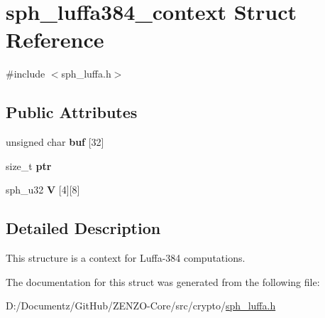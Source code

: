 \hypertarget{structsph__luffa384__context}{}\section{sph\+\_\+luffa384\+\_\+context Struct Reference}
\label{structsph__luffa384__context}


{\ttfamily \#include $<$sph\+\_\+luffa.\+h$>$}

\subsection*{Public Attributes}
\begin{DoxyCompactItemize}
\item 
\mbox{\label{structsph__luffa384__context_a48cac0d215386fd163afc273331427a1}} 
unsigned char {\bfseries buf} \mbox{[}32\mbox{]}
\item 
\mbox{\label{structsph__luffa384__context_ab0c41fc53539b3b1499e0900459e4311}} 
size\+\_\+t {\bfseries ptr}
\item 
\mbox{\label{structsph__luffa384__context_a1e3f11fe357732f2e5aee05ad5c6e6d9}} 
sph\+\_\+u32 {\bfseries V} \mbox{[}4\mbox{]}\mbox{[}8\mbox{]}
\end{DoxyCompactItemize}


\subsection{Detailed Description}
This structure is a context for Luffa-\/384 computations. 

The documentation for this struct was generated from the following file\+:\begin{DoxyCompactItemize}
\item 
D\+:/\+Documentz/\+Git\+Hub/\+Z\+E\+N\+Z\+O-\/\+Core/src/crypto/\mbox{\hyperlink{sph__luffa_8h}{sph\+\_\+luffa.\+h}}\end{DoxyCompactItemize}

